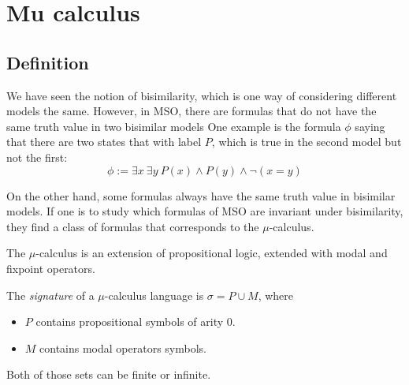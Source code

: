 
\section{Mu calculus}

\subsection{Definition}

We have seen the notion of bisimilarity, which is one way of considering
different models the same. However, in MSO, there are formulas
that do not have the same truth value in two bisimilar models
One example is the formula $\phi$ saying that there are two states that with label $P$,
which is true in the second model but not the first:
\[
    \phi := \exists x~ \exists y~ P(x) \wedge P(y) \wedge \neg (x = y)
\]
    \begin{center}
    \end{center}


On the other hand, some formulas always
have the same truth value in bisimilar models.
If one is to study which formulas of MSO are invariant under bisimilarity,
they find a class of formulas that corresponds to the $\mu$-calculus.

The $\mu$-calculus is an extension of propositional logic,
extended with modal and fixpoint operators.

\begin{definition}
    The \emph{signature} of a $\mu$-calculus language is
    $\sigma = P \cup M$, where
    \begin{itemize}
        \item $P$ contains propositional symbols of arity 0.
        \item $M$ contains modal operators symbols.
    \end{itemize}
    Both of those sets can be finite or infinite.
\end{definition}

